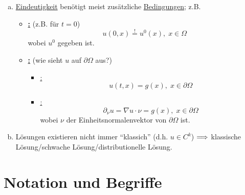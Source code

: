 \begin{bem}
  \begin{enumerate}[(a)]
  \item \underline{Eindeutigkeit} benötigt meist zusätzliche
    \underline{Bedingungen}; z.B.
    \begin{itemize}
    \item \underline{\textbf{:}} (z.B. für $t=0$)
      \[ \boxed{ u(0,x) \overset{!}= u^0(x),\;x\in\Omega} \] wobei $u^0$
      gegeben ist.
    \item \underline{\textbf{:}} (wie sieht $u$ auf
      $\partial\Omega$ aus?)
      \begin{itemize}
      \item \underline{:}
        \[ \boxed{u(t,x)=g(x),\;x\in\partial\Omega} \]
      \item \underline{:}
        \[ \boxed{\partial_\nu u=\nabla u\cdot\nu=g(x),\;
          x\in\partial\Omega} \]
          wobei $\nu$ der Einheitsnormalenvektor von $\partial \Omega$ ist.
      \end{itemize}
    \end{itemize}

  \item Lösungen existieren nicht immer "`klassich"' (d.h. $u\in C^k$)
    $\Longrightarrow$ klassische Lösung/schwache Lösung/distributionelle Lösung.
  \end{enumerate}
\end{bem}

\section{Notation und Begriffe}

